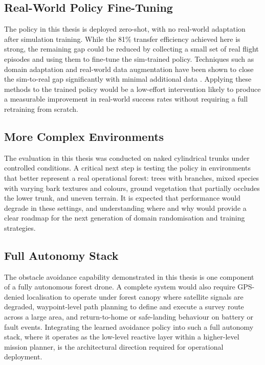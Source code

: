 \documentclass[../main.tex]{subfiles}
\begin{document}
\subsection{Real-World Policy Fine-Tuning}

The policy in this thesis is deployed zero-shot, with no real-world adaptation after simulation training. While the 81\% transfer efficiency achieved here is strong, the remaining gap could be reduced by collecting a small set of real flight episodes and using them to fine-tune the sim-trained policy. Techniques such as domain adaptation and real-world data augmentation have been shown to close the sim-to-real gap significantly with minimal additional data \cite{Qin2025}. Applying these methods to the trained policy would be a low-effort intervention likely to produce a measurable improvement in real-world success rates without requiring a full retraining from scratch.

\subsection{More Complex Environments}

The evaluation in this thesis was conducted on naked cylindrical trunks under controlled conditions. A critical next step is testing the policy in environments that better represent a real operational forest: trees with branches, mixed species with varying bark textures and colours, ground vegetation that partially occludes the lower trunk, and uneven terrain. It is expected that performance would degrade in these settings, and understanding where and why would provide a clear roadmap for the next generation of domain randomisation and training strategies.

\subsection{Full Autonomy Stack}

The obstacle avoidance capability demonstrated in this thesis is one component of a fully autonomous forest drone. A complete system would also require GPS-denied localisation to operate under forest canopy where satellite signals are degraded, waypoint-level path planning to define and execute a survey route across a large area, and return-to-home or safe-landing behaviour on battery or fault events. Integrating the learned avoidance policy into such a full autonomy stack, where it operates as the low-level reactive layer within a higher-level mission planner, is the architectural direction required for operational deployment.
\end{document}
